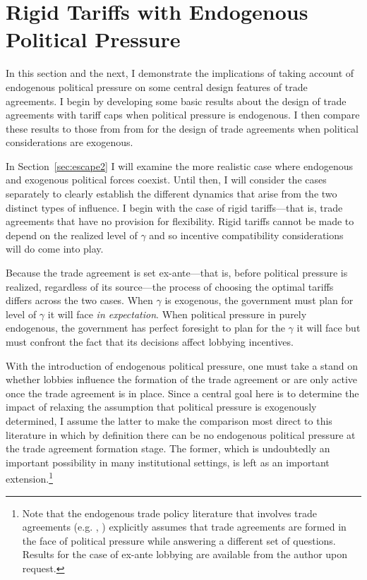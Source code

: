 \documentclass[12pt]{article}
\newcommand{\ga}{\gamma}
\begin{document}
\section{Rigid Tariffs with Endogenous Political Pressure}
\label{sec:rigid}
In this section and the next, I demonstrate the implications of taking account of endogenous political pressure on some central design features of trade agreements. I begin by developing some basic results about the design of trade agreements with tariff caps when political pressure is endogenous. I then compare these results to those from from \Textcite{bs2005} for the design of trade agreements when political considerations are exogenous.

In Section~\ref{sec:escape2} I will examine the more realistic case where endogenous and exogenous political forces coexist. Until then, I will consider the cases separately to clearly establish the different dynamics that arise from the two distinct types of influence. I begin with the case of rigid tariffs---that is, trade agreements that have no provision for flexibility. Rigid tariffs cannot be made to depend on the realized level of $\ga$ and so incentive compatibility considerations will do come into play.


Because the trade agreement is set ex-ante---that is, before political pressure is realized, regardless of its source---the process of choosing the optimal tariffs differs across the two cases. When $\ga$ is exogenous, the government must plan for level of $\ga$ it will face \textit{in expectation}. When political pressure in purely endogenous, the government has perfect foresight to plan for the $\ga$ it will face but must confront the fact that its decisions affect lobbying incentives.

With the introduction of endogenous political pressure, one must take a stand on whether lobbies influence the formation of the trade agreement or are only active once the trade agreement is in place. Since a central goal here is to determine the impact of relaxing the assumption that political pressure is exogenously determined, I assume the latter to make the comparison most direct to this literature in which by definition there can be no endogenous political pressure at the trade agreement formation stage. The former, which is undoubtedly an important possibility in many institutional settings, is left as an important extension.\footnote{Note that the endogenous trade policy literature that involves trade agreements (e.g. \Textcite{gh95}, \Textcite{mrc2007}) explicitly assumes that trade agreements are formed in the face of political pressure while answering a different set of questions. Results for the case of ex-ante lobbying are available from the author upon request.}
\end{document}

